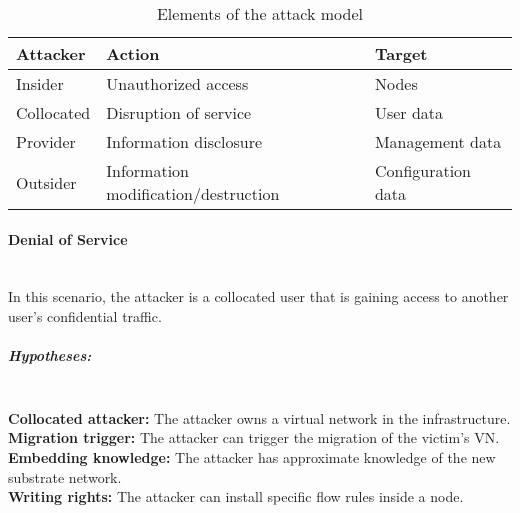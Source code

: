 
\begin{table}[h]
\centering
\begin{tabular}{|l|l|l|}
\hline
\textbf{Attacker}   & \textbf{Action}    & \textbf{Target}             \\ \hline
Insider    & Unauthorized access                  & Nodes              \\ \hline
Collocated & Disruption of service                & User data          \\ \hline
Provider   & Information disclosure               & Management data    \\ \hline
Outsider   & Information modification/destruction & Configuration data \\ \hline
\end{tabular}
\caption{Elements of the attack model}
\label{tab:attack-model}
\end{table}

\paragraph{Denial of Service}\textbf{\\}
In this scenario, the attacker is a collocated user that is gaining access to another user's confidential traffic. 
\subparagraph{Hypotheses:}\textbf{\\}
\textbf{Collocated attacker:} The attacker owns a virtual network in the infrastructure.\\
\textbf{Migration trigger:} The attacker can trigger the migration of the victim's VN.\\
\textbf{Embedding knowledge:} The attacker has approximate knowledge of the new substrate network.\\
\textbf{Writing rights:} The attacker can install specific flow rules inside a node.

